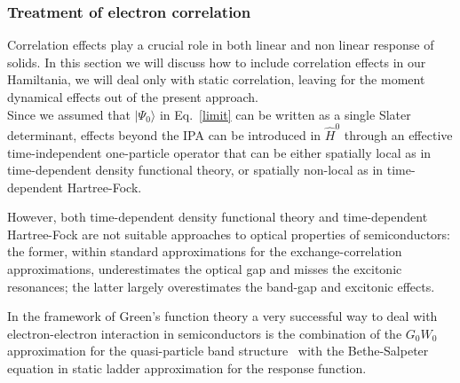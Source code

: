 \subsubsection{Treatment of electron correlation}\label{ss:correff}
Correlation effects play a crucial role in both linear\cite{Onida} and non linear\cite{PhysRevB.82.235201,PhysRevB.80.155205} response of solids. %
In this section we will discuss how to include correlation effects in our Hamiltania, we will deal only with static correlation, leaving for the moment dynamical effects out of the present approach.\\
Since we assumed that $|\Psi_0\rangle$ in Eq.~\eqref{limit} can be written as a single Slater determinant, effects beyond the IPA can be introduced in $\hat H^0$ through an effective time-independent one-particle operator that can be either spatially local as in time-dependent density functional theory, or spatially non-local as in time-dependent Hartree-Fock. 

However, both time-dependent density functional theory and time-dependent Hartree-Fock are not suitable approaches to optical properties of semiconductors: the former, within standard approximations for the exchange-correlation approximations, underestimates the optical gap and misses the excitonic resonances; the latter largely overestimates the band-gap and excitonic effects.   

In the framework of Green's function theory a very successful way to deal with electron-electron interaction in semiconductors is the combination of the $G_0W_0$ approximation for the quasi-particle band structure~\cite{PhysRevB.25.2867} with the Bethe-Salpeter equation in static ladder approximation for the response function.~\cite{strinati}  

